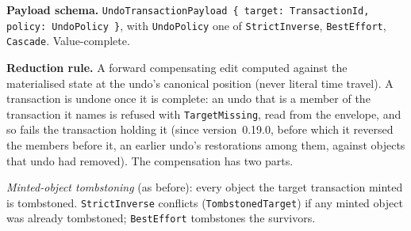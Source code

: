 \documentclass[11pt,letterpaper]{report}
\begin{document}
\textbf{Payload schema.} \texttt{UndoTransactionPayload \{ target: TransactionId,
policy: UndoPolicy \}}, with \texttt{UndoPolicy} one of \texttt{StrictInverse},
\texttt{BestEffort}, \texttt{Cascade}. Value-complete.

\textbf{Reduction rule.} A forward compensating edit computed against the
materialised state at the undo's canonical position (never literal time
travel). A transaction is undone once it is complete: an undo that is a member
of the transaction it names is refused with \texttt{TargetMissing}, read from
the envelope, and so fails the transaction holding it (since
version~0.19.0, before which it reversed the members before it, an earlier
undo's restorations among them, against objects that undo had removed). The
compensation has two parts.

\emph{Minted-object tombstoning} (as before): every object the target
transaction minted is tombstoned. \texttt{StrictInverse} conflicts
(\texttt{TombstonedTarget}) if any minted object was already tombstoned;
\texttt{BestEffort} tombstones the survivors.
\end{document}
